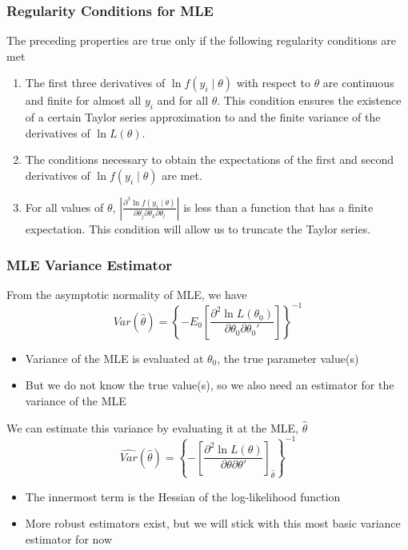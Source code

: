 \documentclass{beamer}
\begin{document}
\begin{frame}\frametitle{Regularity Conditions for MLE}
    The preceding properties are true only if the following regularity conditions are met
    \begin{enumerate}
        \item The first three derivatives of $\ln f(y_i \mid \theta)$ with respect to $\theta$ are continuous and finite for almost all $y_i$ and for all $\theta$. This condition ensures the existence of a certain Taylor series approximation to and the finite variance of the derivatives of $\ln L(\theta)$.
        \item The conditions necessary to obtain the expectations of the first and second derivatives of $\ln f(y_i \mid \theta)$ are met.
        \item For all values of $\theta$, $\left\vert \frac{\partial^3 \ln f(y_i \mid \theta)}{\partial \theta_j \partial \theta_k \partial \theta_l} \right\vert$ is less than a function that has a
        finite expectation. This condition will allow us to truncate the Taylor series.
    \end{enumerate}
\end{frame}

\begin{frame}\frametitle{MLE Variance Estimator}
    From the asymptotic normality of MLE, we have
    $$Var(\hat{\theta}) = \left\{ -E_0 \left[ \frac{\partial^2 \ln L(\theta_0)}{\partial \theta_0 \partial \theta_0'} \right] \right\}^{-1}$$
    \begin{itemize}
        \item Variance of the MLE is evaluated at $\theta_0$, the true parameter value(s)
        \item But we do not know the true value(s), so we also need an estimator for the variance of the MLE
    \end{itemize}
    \vspace{2ex}
    We can estimate this variance by evaluating it at the MLE, $\hat{\theta}$
    $$\widehat{Var}(\hat{\theta}) = \left\{ - \left[ \frac{\partial^2 \ln L(\theta)}{\partial \theta \partial \theta'} \right]_{\hat{\theta}} \right\}^{-1}$$
    \begin{itemize}
        \item The innermost term is the Hessian of the log-likelihood function
        \item More robust estimators exist, but we will stick with this most basic variance estimator for now
    \end{itemize}
\end{frame}
\end{document}
